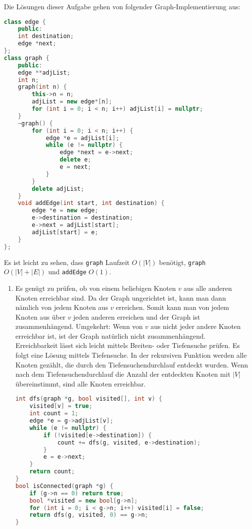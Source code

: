 \documentclass[11pt,a4paper]{article}
\begin{document}
\begin{loesung}
    Die Lösungen dieser Aufgabe gehen von folgender Graph-Implementierung aus:
    \begin{lstlisting}[language=c++]
class edge {
    public:
    int destination; 
    edge *next;
};
class graph {
    public: 
    edge **adjList;
    int n;
    graph(int n) {
        this->n = n;
        adjList = new edge*[n];
        for (int i = 0; i < n; i++) adjList[i] = nullptr;
    }
    ~graph() {
        for (int i = 0; i < n; i++) {
            edge *e = adjList[i];
            while (e != nullptr) {
                edge *next = e->next;
                delete e;
                e = next;
            }
        }
        delete adjList;
    }
    void addEdge(int start, int destination) {
        edge *e = new edge;
        e->destination = destination;
        e->next = adjList[start];
        adjList[start] = e;
    }
};
    \end{lstlisting}
    Es ist leicht zu sehen, dass \texttt{graph} Laufzeit $O(|V|)$ benötigt, \texttt{\raisebox{-0.8ex}{\~{}}graph} $O(|V| + |E|)$ und \texttt{addEdge} $O(1)$.

    \begin{enumerate}
        \item Es genügt zu prüfen, ob von einem beliebigen Knoten $v$ aus alle anderen Knoten erreichbar sind.
        Da der Graph ungerichtet ist, kann man dann nämlich von jedem Knoten aus $v$ erreichen.
        Somit kann man von jedem Knoten aus über $v$ jeden anderen erreichen und der Graph ist zusammenhängend.
        Umgekehrt: Wenn von $v$ aus nicht jeder andere Knoten erreichbar ist, ist der Graph natürlich nicht zusammenhängend.
        Erreichbarkeit lässt sich leicht mittels Breiten- oder Tiefensuche prüfen.
        Es folgt eine Lösung mittels Tiefensuche.
        In der rekursiven Funktion werden alle Knoten gezählt, die durch den Tiefensuchendurchlauf entdeckt wurden.
        Wenn nach dem Tiefensuchendurchlauf die Anzahl der entdeckten Knoten mit $|V|$ übereinstimmt, sind alle Knoten erreichbar.
        \begin{lstlisting}[language=c++]
int dfs(graph *g, bool visited[], int v) {
    visited[v] = true;
    int count = 1;
    edge *e = g->adjList[v];
    while (e != nullptr) {
        if (!visited[e->destination]) {
            count += dfs(g, visited, e->destination);
        }
        e = e->next;
    }
    return count;
}
bool isConnected(graph *g) {
    if (g->n == 0) return true;
    bool *visited = new bool[g->n];
    for (int i = 0; i < g->n; i++) visited[i] = false;
    return dfs(g, visited, 0) == g->n;
}
        \end{lstlisting}


\end{enumerate}
\end{loesung}
\end{document}
